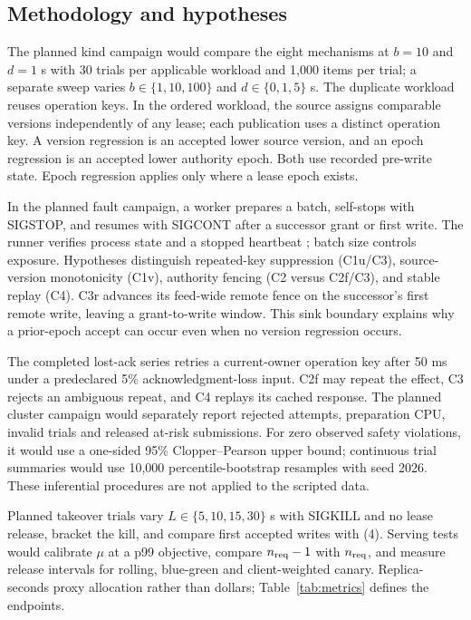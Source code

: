 \documentclass[conference,10pt]{IEEEtran}
\begin{document}
\subsection{Methodology and hypotheses}
The planned kind campaign would compare the eight mechanisms at $b=10$ and $d=1$ s with 30 trials per applicable workload and 1,000 items per trial; a separate sweep varies $b\in\{1,10,100\}$ and $d\in\{0,1,5\}$ s. The duplicate workload reuses operation keys. In the ordered workload, the source assigns comparable versions independently of any lease; each publication uses a distinct operation key. A version regression is an accepted lower source version, and an epoch regression is an accepted lower authority epoch. Both use recorded pre-write state. Epoch regression applies only where a lease epoch exists.

In the planned fault campaign, a worker prepares a batch, self-stops with SIGSTOP, and resumes with SIGCONT after a successor grant or first write. The runner verifies process state and a stopped heartbeat \cite{r25}; batch size controls exposure. Hypotheses distinguish repeated-key suppression (C1u/C3), source-version monotonicity (C1v), authority fencing (C2 versus C2f/C3), and stable replay (C4). C3r advances its feed-wide remote fence on the successor's first remote write, leaving a grant-to-write window. This sink boundary explains why a prior-epoch accept can occur even when no version regression occurs.

The completed lost-ack series retries a current-owner operation key after 50 ms under a predeclared 5\% acknowledgment-loss input. C2f may repeat the effect, C3 rejects an ambiguous repeat, and C4 replays its cached response. The planned cluster campaign would separately report rejected attempts, preparation CPU, invalid trials and released at-risk submissions. For zero observed safety violations, it would use a one-sided 95\% Clopper--Pearson upper bound; continuous trial summaries would use 10,000 percentile-bootstrap resamples with seed 2026. These inferential procedures are not applied to the scripted data.

Planned takeover trials vary $L\in\{5,10,15,30\}$ s with SIGKILL and no lease release, bracket the kill, and compare first accepted writes with (4). Serving tests would calibrate $\mu$ at a p99 objective, compare $n_{\rm req}-1$ with $n_{\rm req}$, and measure release intervals for rolling, blue-green and client-weighted canary. Replica-seconds proxy allocation rather than dollars; Table~\ref{tab:metrics} defines the endpoints.
\end{document}
